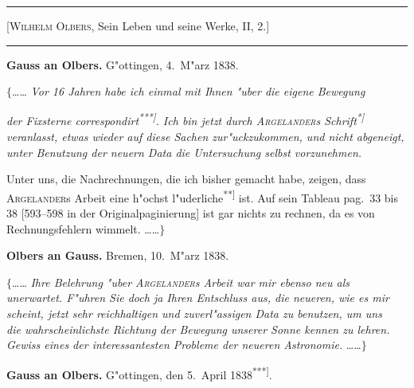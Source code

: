 \documentclass[12pt,a4paper]{article}
\theoremstyle{plain}
\theoremstyle{definition}
\theoremstyle{remark}
\begin{document}
\vspace{1em}
\begin{center}
\rule{\textwidth}{0.4pt}
{\small [\textsc{Wilhelm Olbers}, Sein Leben und seine Werke, II, 2.]}
\rule{\textwidth}{0.4pt}
\end{center}

\vspace{1em}
\begin{center}
\textbf{Gauss an Olbers.} \quad G"ottingen, 4.\ M"arz 1838.
\end{center}

\noindent
$\{$\ldots{}\ldots{} {\itshape Vor 16 Jahren habe ich einmal mit Ihnen "uber die eigene Bewegung} \\ {\itshape der Fixsterne correspondirt\textsuperscript{***]}. Ich bin jetzt durch \textsc{Argelander}s Schrift\textsuperscript{*]} veranlasst, etwas wieder auf diese Sachen zur"uckzukommen, und nicht abgeneigt, unter Benutzung der neuern Data die Untersuchung selbst vorzunehmen.

Unter uns, die Nachrechnungen, die ich bisher gemacht habe, zeigen, dass \textsc{Argelander}s Arbeit eine h"ochst l"uderliche\textsuperscript{**]} ist. Auf sein Tableau pag.\ 33 bis 38 [593--598 in der Originalpaginierung] ist gar nichts zu rechnen, da es von Rechnungsfehlern wimmelt. \ldots{}\ldots{}$\}$

\vspace{1em}
\begin{center}
\textbf{Olbers an Gauss.} \quad Bremen, 10.\ M"arz 1838.
\end{center}

\noindent
$\{$\ldots{}\ldots{} {\itshape Ihre Belehrung "uber \textsc{Argelander}s Arbeit war mir ebenso neu als} \\ {\itshape unerwartet. F"uhren Sie doch ja Ihren Entschluss aus, die neueren, wie es mir} \\ {\itshape scheint, jetzt sehr reichhaltigen und zuverl"assigen Data zu benutzen, um uns} \\ {\itshape die wahrscheinlichste Richtung der Bewegung unserer Sonne kennen zu lehren.} \\ {\itshape Gewiss eines der interessantesten Probleme der neueren Astronomie.} \ldots{}\ldots{}$\}$

\vspace{1em}
\begin{center}
\textbf{Gauss an Olbers.} \quad G"ottingen, den 5.\ April 1838\textsuperscript{***]}.
\end{center}

}
\end{document}
